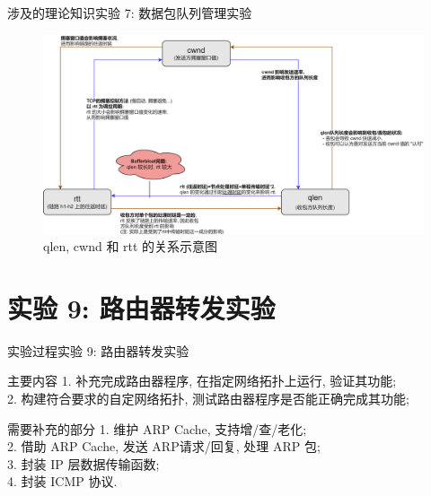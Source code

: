 \documentclass{beamer}
\begin{document}
\begin{frame}{涉及的理论知识}{实验 7: 数据包队列管理实验}
    \begin{figure}[h]
        \centering %
        \includegraphics[width=340pt]{
            ../lab-07-pktq/readme.assets/lab-07-relation-between-cwnd-qlen-rtt.png}
        \caption{qlen, cwnd 和 rtt 的关系示意图} %
    \end{figure}
\end{frame}

\section{实验 9: 路由器转发实验}
\begin{frame}
    \sectionpage
\end{frame}

\begin{frame}{实验过程}{实验 9: 路由器转发实验}
    \begin{block}{主要内容}
        1. 补充完成路由器程序, 在指定网络拓扑上运行,
        验证其功能;\\
        2. 构建符合要求的自定网络拓扑,
        测试路由器程序是否能正确完成其功能;
    \end{block}
    \begin{block}{需要补充的部分}
        1. 维护 ARP Cache, 支持增/查/老化;\\
        2. 借助 ARP Cache, 发送 ARP请求/回复, 处理 ARP 包;\\
        3. 封装 IP 层数据传输函数;\\
        4. 封装 ICMP 协议.
    \end{block}
\end{frame}
\end{document}
